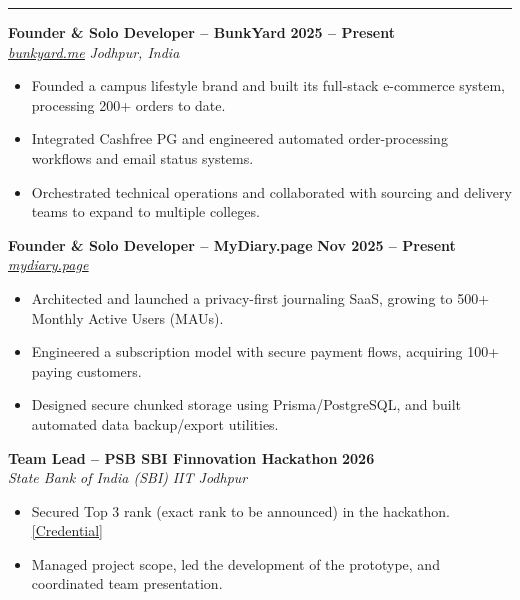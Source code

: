 \documentclass[10pt,letterpaper]{article}
\newcommand{\resumesection}[1]{%
  \vspace{5pt}
  \noindent{\large\textbf{#1}}
  \vspace{2pt}
  \hrule
  \vspace{2pt}
}
\newcommand{\subheading}[2]{%
  \noindent\textit{\textcolor{subheadinggrey}{#1}} \hfill \textit{\textcolor{subheadinggrey}{#2}}%
}
\begin{document}
\resumesection{Experience}
\noindent \textbf{Founder \& Solo Developer -- BunkYard} \hfill \textbf{2025 -- Present} \\
\subheading{\href{https://bunkyard.me}{\underline{bunkyard.me}}}{Jodhpur, India}
\begin{itemize}
    \item Founded a campus lifestyle brand and built its full-stack e-commerce system, processing 200+ orders to date.
    \item Integrated Cashfree PG and engineered automated order-processing workflows and email status systems.
    \item Orchestrated technical operations and collaborated with sourcing and delivery teams to expand to multiple colleges.
\end{itemize}
\vspace{4pt}
\noindent \textbf{Founder \& Solo Developer -- MyDiary.page} \hfill \textbf{Nov 2025 -- Present} \\
\subheading{\href{https://mydiary.page}{\underline{mydiary.page}}}{}
\begin{itemize}
    \item Architected and launched a privacy-first journaling SaaS, growing to 500+ Monthly Active Users (MAUs).
    \item Engineered a subscription model with secure payment flows, acquiring 100+ paying customers.
    \item Designed secure chunked storage using Prisma/PostgreSQL, and built automated data backup/export utilities.
\end{itemize}
\vspace{4pt}

\noindent \textbf{Team Lead -- PSB SBI Finnovation Hackathon} \hfill \textbf{2026} \\
\subheading{State Bank of India (SBI)}{IIT Jodhpur}
\begin{itemize}
    \item Secured Top 3 rank (exact rank to be announced) in the hackathon. \hfill \href{https://anoonimouse.github.io/myresume/sbi_finnovation_26_rotated.pdf}{\underline{[Credential]}}
    \item Managed project scope, led the development of the prototype, and coordinated team presentation.
\end{itemize}
\vspace{4pt}
\end{document}
